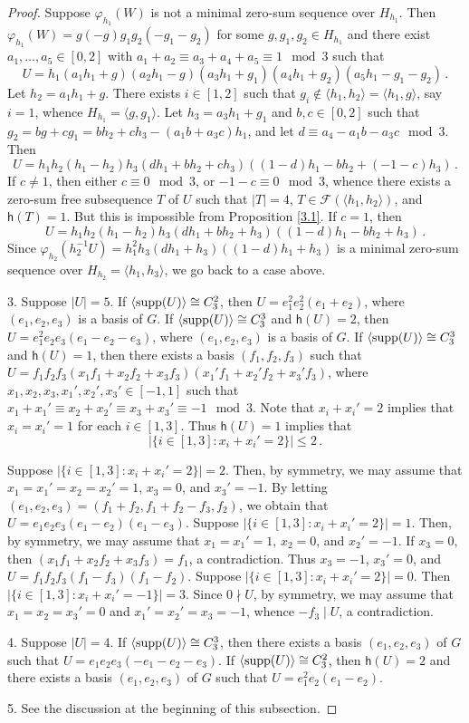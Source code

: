\documentclass[a4paper, 10pt]{amsart}
\theoremstyle{plain}
\theoremstyle{definition}
\theoremstyle{definition}
\numberwithin{equation}{section}
\begin{document}
\begin{proof}
	Suppose $\varphi_{h_1}(W)$ is not a minimal zero-sum sequence over $H_{h_1}$.
	Then $\varphi_{h_1}(W)=g(-g)g_1g_2(-g_1-g_2)$ for some $g,g_1,g_2\in H_{h_1}$ and there exist $a_1,\ldots,a_5\in [0,2]$ with $a_1+a_2\equiv a_3+a_4+a_5\equiv 1\mod 3$ such that
	\[
	U=h_1(a_1h_1+g)(a_2h_1-g)(a_3h_1+g_1)(a_4h_1+g_2) (a_5h_1-g_1-g_2) \,.
	\]
	Let $h_2=a_1h_1+g$. There exists $i\in [1,2]$ such that $g_i\not\in \langle h_1,h_2 \rangle=\langle h_1,g\rangle$, say $i=1$, whence $H_{h_1}=\langle g, g_1\rangle$. Let $h_3=a_3h_1+g_1$ and $b,c\in [0,2]$ such that $g_2=bg+cg_1=bh_2+ch_3-(a_1b+a_3c)h_1$, and let $d\equiv a_4-a_1b-a_3c \mod 3$. Then
	\[
	U=h_1h_2(h_1-h_2)h_3(dh_1+bh_2+ch_3) ((1-d)h_1-bh_2+(-1-c)h_3) \,.
	\]	
	If $c\neq 1$, then either $c\equiv 0\mod 3$, or $-1-c\equiv 0 \mod 3$, whence there exists a zero-sum free subsequence $T$ of $U$ such that $|T|=4$, $T\in \mathcal F(\langle h_1, h_2\rangle)$, and $\mathsf h(T)=1$. But this is impossible from Proposition \ref{3.1}.
	If $c=1$, then \[
	U=h_1h_2(h_1-h_2)h_3(dh_1+bh_2+h_3) ((1-d)h_1-bh_2+h_3) \,.
	\]
	Since $\varphi_{h_2}(h_2^{-1}U)=h_1^2h_3(dh_1+h_3)((1-d)h_1+h_3)$ is a minimal zero-sum sequence over $H_{h_2}=\langle h_1,h_3\rangle$, we go back to a case above.


3. Suppose $|U|=5$. If  $\langle \operatorname{supp}(U)\rangle\cong C_3^2$, then $U=e_1^2e_2^2(e_1+e_2)$, where $(e_1,e_2,e_3)$ is a basis of $G$.
	If $\langle \operatorname{supp}(U)\rangle\cong C_3^3$ and $\mathsf h(U)=2$, then $U=e_1^2e_2e_3(e_1-e_2-e_3)$, where $(e_1,e_2,e_3)$ is a basis of $G$.
	If $\langle \operatorname{supp}(U)\rangle\cong C_3^3$ and $\mathsf h(U)=1$, then there exists a basis $(f_1,f_2,f_3)$ such that $U=f_1f_2f_3(x_1f_1+x_2f_2+x_3f_3)(x_1'f_1+x_2'f_2+x_3'f_3)$, where $x_1,x_2,x_3,x_1',x_2',x_3'\in [-1,1]$ such that $x_1+x_1'\equiv x_2+x_2'\equiv x_3+x_3'\equiv -1\mod 3$. Note that $x_i+x_i'=2$ implies that $x_i=x_i'=1$ for each $i\in [1,3]$. Thus $\mathsf h(U)=1$ implies that  $$|\{i\in[1,3]\colon x_i+x_i'=2\}|\le 2\,.$$
	
	Suppose $|\{i\in[1,3]\colon x_i+x_i'=2\}|= 2$. Then, by symmetry, we may assume that $x_1=x_1'=x_2=x_2'=1$, $x_3=0$, and $x_3'=-1$. By letting $(e_1,e_2,e_3)=(f_1+f_2, f_1+f_2-f_3, f_2)$, we obtain that $U=e_1e_2e_3(e_1-e_2)(e_1-e_3)$.
	Suppose $|\{i\in[1,3]\colon x_i+x_i'=2\}|= 1$. Then, by symmetry, we may assume that $x_1=x_1'=1$, $x_2=0$, and $x_2'=-1$. If $x_3=0$, then $(x_1f_1+x_2f_2+x_3f_3)=f_1$, a contradiction. Thus $x_3=-1$, $x_3'=0$, and  $U=f_1f_2f_3(f_1-f_3)(f_1-f_2)$. Suppose $|\{i\in[1,3]\colon x_i+x_i'=2\}|= 0$. Then $|\{i\in[1,3]\colon x_i+x_i'=-1\}|= 3$. Since $0\nmid U$, by symmetry, we may assume that $x_1=x_2=x_3'=0$ and $x_1'=x_2'=x_3=-1$, whence $-f_3\mid U$, a contradiction.

	
4. Suppose $|U|=4$. If  $\langle \operatorname{supp}(U)\rangle\cong C_3^3$, then there exists  a basis $(e_1,e_2,e_3)$ of $G$ such that  $U=e_1e_2e_3(-e_1-e_2-e_3)$.	If $\langle \operatorname{supp}(U)\rangle\cong C_3^2$, then  $\mathsf h(U)=2$ and there exists a basis $(e_1,e_2,e_3)$ of $G$ such that $U=e_1^2e_2(e_1-e_2)$.

5. See the discussion at the beginning of this subsection.
\end{proof}
\end{document}
